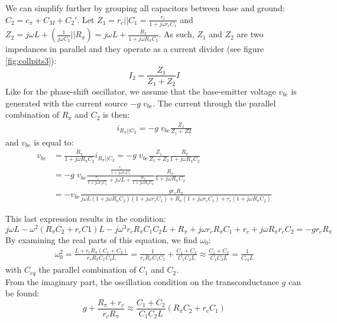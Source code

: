 We can simplify further by grouping all capacitors between base and ground: $C_2 = c_\pi + C_M + C_2'$. Let $Z_1 = r_c || C_1 = \frac{r_c}{1 + j\omega r_c C_1}$ and $Z_2 = j\omega L + (\frac{1}{j\omega C_2} || R_\pi) = j\omega L + \frac{R_\pi}{1 + j\omega R_\pi C_2}$. As such, $Z_1$ and $Z_2$ are two impedances in parallel and they operate as a current divider (see figure \ref{fig:collpits3}): 
$$
I_2 = \frac{Z_1}{Z_1 + Z_2} I
$$
Like for the phase-shift oscillator, we assume that the base-emitter voltage $v_{be}$ is generated with the current source $-g\;v_{be}$. The current through the parallel combination of $R_\pi$ and $C_2$ is then:
\begin{align*}
	i_{R_\pi||C_2} = -g\;v_{be} \frac{Z_1}{Z_1 + Z2} 
\end{align*}
and $v_{be}$ is equal to:
\begin{align*}
v_{be} &= \frac{R_\pi}{1 + j\omega R_\pi C_2} i_{R_\pi||C_2} = -g\;v_{be} \frac{Z_1}{Z_1 + Z_2} \frac{R_\pi}{1 + j\omega R_\pi C_2} \\
	   &=  -g\;v_{be} \frac{\frac{r_c}{1 + j\omega r_c C_1}}{\frac{r_c}{1 + j\omega r_c C_1} + j\omega L + \frac{R_\pi}{1 + j\omega R_\pi C_2}} \frac{R_\pi}{1 + j\omega R_\pi C_2} \\
	   &= - v_{be} \frac{g r_c R_\pi}{j\omega L (1 + j \omega R_\pi C_2)(1 + j \omega r_c C_1) + R_\pi (1 + j \omega r_c C_1) + r_c (1 + j \omega R_\pi C_2)}
\end{align*}

This last expression results in the condition:
$$
j\omega L -\omega^2 (R_\pi C_2 + r_c C1) L - j\omega^3 r_c R_\pi C_1 C_2 L + R_\pi + j\omega r_c R_\pi C_1 + r_c + j\omega R_\pi r_c C_2 = -g r_c R_\pi
$$
By examining the real parts of this equation, we find $\omega_0$:
\begin{align*}
	\omega_0^2 = \frac{L+ r_c R_\pi (C_1 + C_2)}{r_c R_\pi C_1 C_2 L} = \frac{1}{r_c R_\pi C_1 C_2} + \frac{C_1 + C_2}{C_1 C_2 L} \approx \frac{C_1 + C_2}{C_1 C_2 L} = \frac{1}{C_{eq} L}
\end{align*}
with $C_{eq}$ the parallel combination of $C_1$ and $C_2$. \\
From the imaginary part, the oscillation condition on the transconductance $g$ can be found:
$$
g + \frac{R_\pi + r_c}{r_c R_\pi} \approx \frac{C_1 + C_2}{C_1 C_2 L}(R_\pi C_2 + r_c C_1) 
$$

